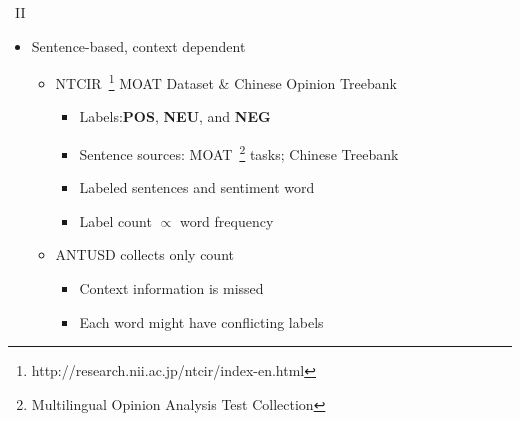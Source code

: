\documentclass[compress]{beamer}
\begin{document}
        \begin{frame}{\subsecname\ II}
            \begin{itemize}
                \item Sentence-based, context dependent
                    \begin{itemize}
                        \item NTCIR~\footnote{http://research.nii.ac.jp/ntcir/index-en.html} MOAT Dataset \& Chinese Opinion Treebank
                            \begin{itemize}
                                \item Labels:\textbf{POS}, \textbf{NEU}, and \textbf{NEG}
                                \item Sentence sources: MOAT~\footnote{Multilingual Opinion Analysis Test Collection} tasks; Chinese Treebank
                                \item Labeled sentences and sentiment word
                                \item Label count $\propto$ word frequency
                            \end{itemize}
                        \item ANTUSD collects only count
                            \begin{itemize}
                                \item Context information is missed
                                \item Each word might have conflicting labels
                            \end{itemize}
                    \end{itemize}
            \end{itemize}
        \end{frame}
\end{document}
